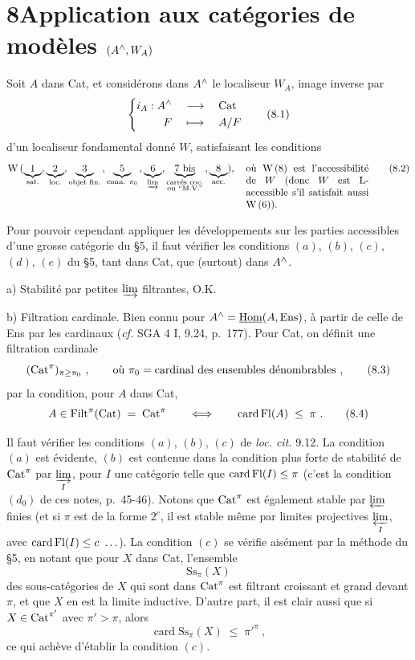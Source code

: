 \section*{8\quad Application aux catégories de modèles $(A^{\wedge},W_A)$}

Soit $A$ dans Cat, et considérons dans $A^{\wedge}$ le localiseur $W_A$, image inverse par
\[
\left\{
\begin{aligned}
i_A : A^{\wedge} \quad &\longrightarrow \quad \mathrm{Cat}\\
F \quad &\longmapsto \quad A/F
\end{aligned}
\right.
\tag*{(8.1)}
\]
d'un localiseur fondamental donné $W$, satisfaisant les conditions
\[
\mathrm{W}\,(\underbrace{1}_{\text{sat.}},\underbrace{2}_{\text{loc.}},\underbrace{3}_{\text{objet fin.}}\,,\underbrace{5}_{\text{conn. }\pi_0}\,,\underbrace{6}_{\varinjlim},\underbrace{7\text{ bis}}_{\substack{\text{carrés coc.}\\ \text{ou ``M.V.''}}}\,,\underbrace{8}_{\text{acc.}}),\quad
\text{\parbox[t]{4.3cm}{où W\,(8) est l'accessibilité de $W$ (donc $W$ est L-accessible s'il satisfait aussi W\,(6)).}}
\tag*{(8.2)}
\]

Pour pouvoir cependant appliquer les développements sur les parties accessibles d'une grosse catégorie du §5, il faut vérifier les conditions $(a)$, $(b)$, $(c)$, $(d)$, $(e)$ du §5, tant dans Cat, que (surtout) dans $A^{\wedge}$.

a) Stabilité par petites $\varinjlim$ filtrantes, O.K.

b) Filtration cardinale. Bien connu pour $A^{\wedge} = \underline{\mathrm{Hom}}(A,\mathrm{Ens})$, à partir de celle de Ens par les cardinaux (\textit{cf.} SGA 4 I, 9.24, p.~177). Pour Cat, on définit une filtration cardinale
\[
(\mathrm{Cat}^{\pi})_{\pi\geq\pi_0}\ , \qquad \text{où } \pi_0 = \text{cardinal des ensembles dénombrables}\ ,
\tag*{(8.3)}
\]
par la condition, pour $A$ dans Cat,
\[
A\in \mathrm{Filt}^{\pi}(\mathrm{Cat}) \;=\; \mathrm{Cat}^{\pi} \qquad\Longleftrightarrow\qquad \operatorname{card}\mathrm{Fl}(A) \;\leq\; \pi\ .
\tag*{(8.4)}
\]

Il faut vérifier les conditions $(a)$, $(b)$, $(c)$ de \textit{loc. cit.} 9.12. La condition $(a)$ est évidente, $(b)$ est contenue dans la condition plus forte de stabilité de $\mathrm{Cat}^{\pi}$ par $\varinjlim\limits_{I}$, pour $I$ une catégorie telle que $\operatorname{card}\mathrm{Fl}(I)\leq\pi$ (c'est la condition $(d_0)$ de ces notes, p.~45-46). Notons que $\mathrm{Cat}^{\pi}$ est également stable par $\varprojlim$ finies (et si $\pi$ est de la forme $2^c$, il est stable même par limites projectives $\varprojlim\limits_{I}$, avec $\operatorname{card}\mathrm{Fl}(I)\leq c\ \ldots$). La condition $(c)$ se vérifie aisément par la méthode du §5, en notant que pour $X$ dans Cat, l'ensemble
\[
\mathrm{Ss}_{\pi}(X)
\]
des sous-catégories de $X$ qui sont dans $\mathrm{Cat}^{\pi}$ est filtrant croissant et grand devant $\pi$, et que $X$ en est la limite inductive. D'autre part, il est clair aussi que si $X\in\mathrm{Cat}^{\pi'}$ avec $\pi'>\pi$, alors
\[
\operatorname{card}\mathrm{Ss}_{\pi}(X) \;\leq\; \pi'^{\pi}\ ,
\]
ce qui achève d'établir la condition $(c)$.

